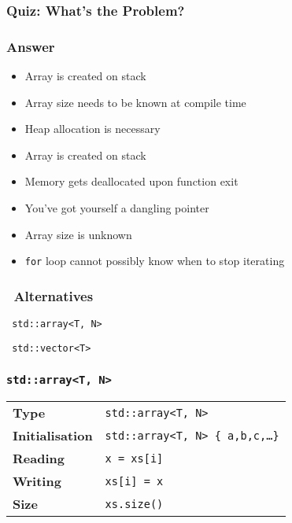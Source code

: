 \documentclass{../ucll-slides}
\begin{document}
\begin{frame}
  \frametitle{Quiz: What's the Problem?}
\end{frame}

\begin{frame}
  \frametitle{Answer}
  \begin{itemize}
    \item Array is created on stack
    \item Array size needs to be known at compile time
    \item Heap allocation is necessary
  \end{itemize}
  \vskip5mm
  \begin{itemize}
    \item Array is created on stack
    \item Memory gets deallocated upon function exit
    \item You've got yourself a dangling pointer
  \end{itemize}
  \vskip5mm
  \begin{itemize}
    \item Array size is unknown
    \item {\tt for} loop cannot possibly know when to stop iterating
  \end{itemize}
\end{frame}

\begin{frame}
  \frametitle{\cpp\ Alternatives}
  \begin{center} \tt
    std::array<T, N>
  \end{center}
  \vskip5mm
  \begin{center} \tt
    std::vector<T>
  \end{center}
\end{frame}

\begin{frame}
  \frametitle{\tt std::array<T, N>}
  \begin{center}
    \begin{tabular}{ll}
      \bf Type & {\tt std::array<T, N>} \\[2mm]
      \bf Initialisation & {\tt std::array<T, N> \{ a,b,c,\dots \}} \\[2mm]
      \bf Reading & {\tt x = xs[i]} \\[2mm]
      \bf Writing & {\tt xs[i] = x} \\[2mm]
      \bf Size & {\tt xs.size()} \\
    \end{tabular}
  \end{center}
\end{frame}
\end{document}
